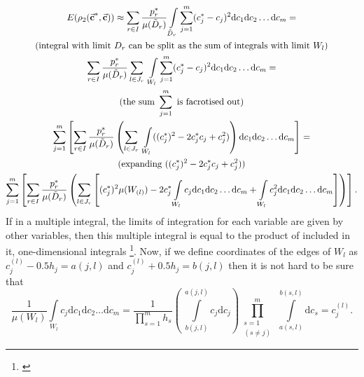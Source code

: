 \begin{gather}
\nonumber
E(\rho_{2}(\vecc^{*},\vecc)) \approx \sum\limits_{r \in I} \frac{p_{r}^{*}}{\mu(\tilde{D}_{r})} \int\limits_{\tilde{D}_{r}} \sum\limits_{j=1}^{m}(c_{j}^{*}-c_{j})^{2}\mathrm{d}c_{1}\mathrm{d}c_{2}\dots \mathrm{d}c_{m} = \\
\nonumber 
\text{(integral with limit } D_{r} \text{ can be split as the sum of integrals with limit } W_{l} \text{)}\\
\sum\limits_{r \in I} \frac{p_{r}^{*}}{\mu(\tilde{D}_{r})} \sum\limits_{l \in J_{r}} \  \int\limits_{W_{l}} \sum\limits_{j=1}^{m}(c_{j}^{*}-c_{j})^{2}\mathrm{d}c_{1}\mathrm{d}c_{2}\dots \mathrm{d}c_{m} = \\
\nonumber
\text{(the sum } \sum_{j=1}^{m} \text{ is facrotised out)} \\
\nonumber
\sum\limits_{j=1}^{m}  \left[ \sum\limits_{r \in I} \frac{p_{r}^{*}}{\mu(\tilde{D}_{r})} \left( \sum\limits_{l \in J_{r}} \ \int\limits_{W_{l}} ((c_{j}^{*})^{2}-2c_{j}^{*}c_{j}+c_{j}^{2}) \right) \mathrm{d}c_{1}\mathrm{d}c_{2}\dots \mathrm{d}c_{m} \right] = \\
\nonumber
\text{(expanding } ((c_{j}^{*})^{2}-2c_{j}^{*}c_{j}+c_{j}^{2}) \text{)}\\
\sum\limits_{j=1}^{m}  \left[ \sum\limits_{r \in I} \frac{p_{r}^{*}}{\mu(\tilde{D}_{r})} \left( \sum\limits_{l \in J_{r}} \left[ (c_{j}^{*})^{2} \mu(W_{(l)}) - 2c_{j}^{*} \int\limits_{W_{l}} c_{j} \mathrm{d}c_{1}\mathrm{d}c_{2}\dots \mathrm{d}c_{m} + \int\limits_{W_{l}} c_{j}^{2} \mathrm{d}c_{1}\mathrm{d}c_{2}\dots \mathrm{d}c_{m} \right] \right) \right]. \label{eq-simplification-chain}
\end{gather}
If in a multiple integral, the limits of integration for each variable are given by other variables, then this multiple integral is equal to the product of included in it, one-dimensional integrals \footnote{\cite{stewart_2008_int}}. Now, if we define coordinates of the edges of $W_{l}$ as $c_{j}^{(l)} - 0.5h_{j} = a(j,l)$ and $c_{j}^{(l)} + 0.5h_{j} = b(j,l)$ then it is not hard to be sure that 
\begin{equation}
\frac{1}{\mu(W_{l})} \int\limits_{W_l} c_{j} \mathrm{d} c_{1} \mathrm{d} c_{2} \ldots  \mathrm{d} c_{m} 
	= \dfrac{1}{\prod\limits_{s=1}^{m}h_{s}}
	\left( \  \int\limits_{b(j,l)}^{a(j,l)} c_{j}  \mathrm{d} c_{j}\right) 
	\prod_{\substack{s=1\\ (s\ne j)}}^m \ 
	\int\limits_{a(s,l)}^{b(s,l)} \!  \mathrm{d} c_{s} 
	= c_{j}^{(l)}.
\end{equation}
